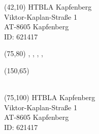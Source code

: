 \documentclass [8pt]{article}
\begin{document}
\pagestyle{empty}

{
\begin{textblock}{55}(42,10)
HTBLA Kapfenberg\\
Viktor-Kaplan-Straße 1\\
AT-8605 Kapfenberg\\
ID: 621417
\end{textblock}


\begin{textblock}{60}(75,80)
\NachrichtTyp, \Lehrer, \Klasse, \Schuler, \Jahr
\end{textblock}

\begin{textblock}{45}(150,65)
\AddrB\\
\AddrC\\
\AddrD
\end{textblock}


\begin{textblock}{55}(75,100)
HTBLA Kapfenberg\\
Viktor-Kaplan-Straße 1\\
AT-8605 Kapfenberg\\
ID: 621417
\end{textblock}


\newpage
}
\end{document}
